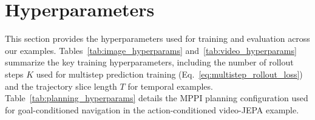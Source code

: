 \documentclass{article}
\begin{document}
\newpage



\appendix
\newpage

\section{Hyperparameters}\label{app:hyperparams}

This section provides the hyperparameters used for training and evaluation across our examples.
Tables~\ref{tab:image_hyperparams} and~\ref{tab:video_hyperparams} summarize the key training hyperparameters, including the number of rollout steps $K$ used for multistep prediction training (Eq.~\eqref{eq:multistep_rollout_loss}) and the trajectory slice length $T$ for temporal examples.
Table~\ref{tab:planning_hyperparams} details the MPPI planning configuration used for goal-conditioned navigation in the action-conditioned video-JEPA example.
\end{document}
